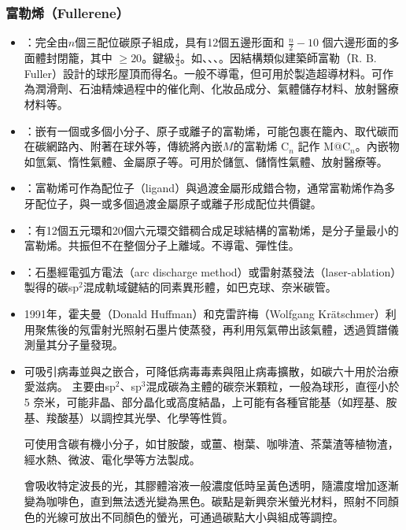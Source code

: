 \documentclass[a4paper,12pt]{report}
\begin{document}
\begin{itemize}
\begin{itemize}
\subsubsection{富勒烯（Fullerene）}
\begin{itemize}
\item {}：完全由$n$個三配位碳原子組成，具有12個五邊形面和 $\frac{n}{2}-10$ 個六邊形面的多面體封閉籠，其中 $\geq 20$。鍵級$\frac{4}{3}$。如、、、。因結構類似建築師富勒（R. B. Fuller）設計的球形屋頂而得名。一般不導電，但可用於製造超導材料。可作為潤滑劑、石油精煉過程中的催化劑、化妝品成分、氣體儲存材料、放射醫療材料等。
\item {}：嵌有一個或多個小分子、原子或離子的富勒烯，可能包裹在籠內、取代碳而在碳網路內、附著在球外等，傳統將內嵌$M$的富勒烯 C$_n$ 記作 M@C$_n$。內嵌物如氫氣、惰性氣體、金屬原子等。可用於儲氫、儲惰性氣體、放射醫療等。
\item {}：富勒烯可作為配位子（ligand）與過渡金屬形成錯合物，通常富勒烯作為多牙配位子，與一或多個過渡金屬原子或離子形成配位共價鍵。
\item {}：有12個五元環和20個六元環交錯稠合成足球結構的富勒烯，是分子量最小的富勒烯。共振但不在整個分子上離域。不導電、彈性佳。
\item {}：石墨經電弧方電法（arc discharge method）或雷射蒸發法（laser-ablation）製得的碳sp$^2$混成軌域鍵結的同素異形體，如巴克球、奈米碳管。
\item 1991年，霍夫曼（Donald Huffman）和克雷許梅（Wolfgang Krätschmer）利用聚焦後的氖雷射光照射石墨片使蒸發，再利用氖氣帶出該氣體，透過質譜儀測量其分子量發現。
\item 可吸引病毒並與之嵌合，可降低病毒毒素與阻止病毒擴散，如碳六十用於治療愛滋病。
\eit
{}
主要由sp$^2$、sp$^3$混成碳為主體的碳奈米顆粒，一般為球形，直徑小於 5 奈米，可能非晶、部分晶化或高度結晶，上可能有各種官能基（如羥基、胺基、羧酸基）以調控其光學、化學等性質。

可使用含碳有機小分子，如甘胺酸，或薑、樹葉、咖啡渣、茶葉渣等植物渣，經水熱、微波、電化學等方法製成。

會吸收特定波長的光，其膠體溶液一般濃度低時呈黃色透明，隨濃度增加逐漸變為咖啡色，直到無法透光變為黑色。碳點是新興奈米螢光材料，照射不同顏色的光線可放出不同顏色的螢光，可通過碳點大小與組成等調控。


\end{itemize}
\end{itemize}
\end{itemize}
\end{document}
